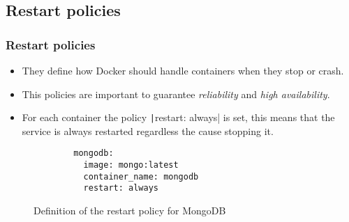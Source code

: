 \subsection{Restart policies}
\begin{frame}[containsverbatim]
	\frametitle{Restart policies}
	
	\begin{itemize}
		\item They define how Docker should handle containers when they stop or crash.
		\item This policies are important to guarantee \emph{reliability} and \emph{high availability}.
		\item For each container the policy \texttt|restart: always| is set, this means that the service is always restarted regardless the cause stopping it.
	\end{itemize}
	
	\begin{figure}[h]
		\begin{verbatim}
        mongodb:
          image: mongo:latest
          container_name: mongodb
          restart: always
		\end{verbatim}
		\caption{Definition of the restart policy for MongoDB}
	\end{figure}
\end{frame}